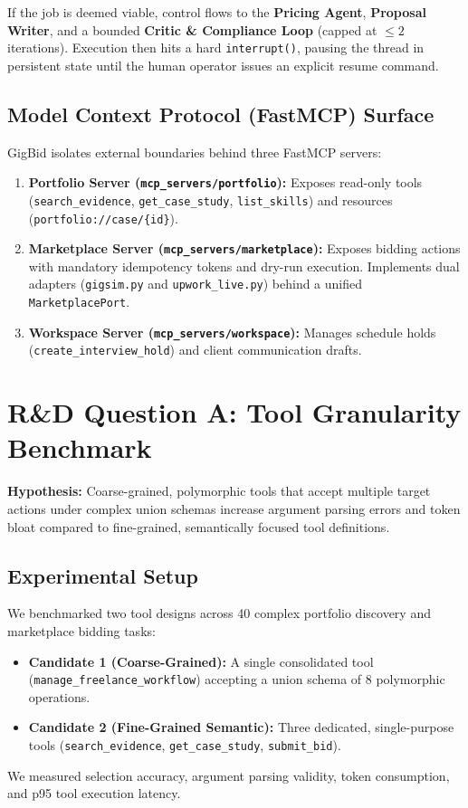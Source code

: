 \documentclass[10pt,a4paper,twocolumn]{article}
\begin{document}
If the job is deemed viable, control flows to the \textbf{Pricing Agent}, \textbf{Proposal Writer}, and a bounded \textbf{Critic \& Compliance Loop} (capped at $\le 2$ iterations). Execution then hits a hard \texttt{interrupt()}, pausing the thread in persistent state until the human operator issues an explicit resume command.

\subsection{Model Context Protocol (FastMCP) Surface}
GigBid isolates external boundaries behind three FastMCP servers:
\begin{enumerate}[leftmargin=*,noitemsep]
    \item \textbf{Portfolio Server (\texttt{mcp\_servers/portfolio}):} Exposes read-only tools (\texttt{search\_evidence}, \texttt{get\_case\_study}, \texttt{list\_skills}) and resources (\texttt{portfolio://case/\{id\}}).
    \item \textbf{Marketplace Server (\texttt{mcp\_servers/marketplace}):} Exposes bidding actions with mandatory idempotency tokens and dry-run execution. Implements dual adapters (\texttt{gigsim.py} and \texttt{upwork\_live.py}) behind a unified \texttt{MarketplacePort}.
    \item \textbf{Workspace Server (\texttt{mcp\_servers/workspace}):} Manages schedule holds (\texttt{create\_interview\_hold}) and client communication drafts.
\end{enumerate}

\section{R\&D Question A: Tool Granularity Benchmark}
\label{sec:question_a}
\textbf{Hypothesis:} Coarse-grained, polymorphic tools that accept multiple target actions under complex union schemas increase argument parsing errors and token bloat compared to fine-grained, semantically focused tool definitions.

\subsection{Experimental Setup}
We benchmarked two tool designs across 40 complex portfolio discovery and marketplace bidding tasks:
\begin{itemize}[leftmargin=*,noitemsep]
    \item \textbf{Candidate 1 (Coarse-Grained):} A single consolidated tool (\texttt{manage\_freelance\_workflow}) accepting a union schema of 8 polymorphic operations.
    \item \textbf{Candidate 2 (Fine-Grained Semantic):} Three dedicated, single-purpose tools (\texttt{search\_evidence}, \texttt{get\_case\_study}, \texttt{submit\_bid}).
\end{itemize}
We measured selection accuracy, argument parsing validity, token consumption, and p95 tool execution latency.
\end{document}
